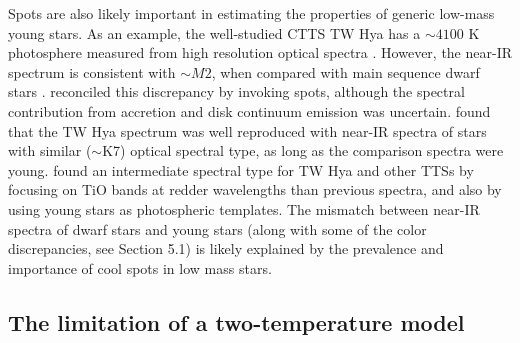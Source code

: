 \documentclass[twocolumn]{emulateapj}%
\begin{document}



Spots are also likely important in estimating the properties of generic low-mass young stars. As an example, the well-studied CTTS TW Hya has a $\sim 4100$ K photosphere measured from high resolution optical spectra \citep[e.g.][]{yang05}.  However, the near-IR spectrum is consistent with $\sim M2$, when compared with main sequence dwarf stars \citep{vacca11}.  \citet{debes13} reconciled this discrepancy by invoking spots, although the spectral contribution from accretion and disk continuum emission was uncertain.  \citet{mcclure13} found that the TW Hya spectrum was well reproduced with near-IR spectra of stars with similar ($\sim$K7) optical spectral type, as long as the comparison spectra were young.   \citet{herczeg14} found an intermediate spectral type for TW Hya and other TTSs by focusing on TiO bands at redder wavelengths than previous spectra, and also by using young stars as photospheric templates.  The mismatch between near-IR spectra of dwarf stars and young stars (along with some of the color discrepancies, see Section 5.1) is likely explained by the prevalence and importance of cool spots in low mass stars.





\subsection{The limitation of a two-temperature model}
\end{document}
